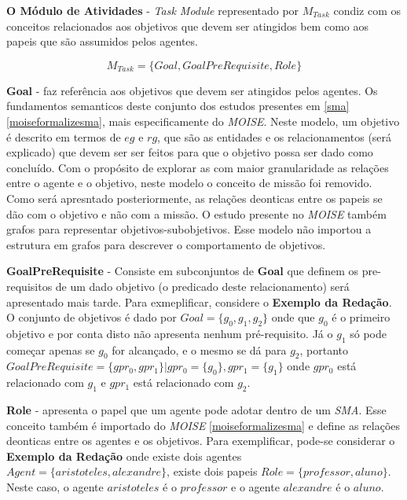 \textbf{O Módulo de Atividades} - \textit{Task Module} representado por $M_{Task}$ condiz com os conceitos relacionados aos objetivos que devem ser 
atingidos bem como aos papeis que são assumidos pelos agentes. 

\begin{equation}
    M_{Task} = \{ Goal, GoalPreRequisite, Role \}
\end{equation}

\textbf{Goal} - faz referência aos objetivos que devem ser atingidos pelos agentes. Os fundamentos semanticos deste conjunto dos estudos presentes em 
\ref{sma} \ref{moiseformalizesma}, mais especificamente do \textit{MOISE}. Neste modelo, um objetivo é descrito em termos de $eg$ e $rg$, que são as entidades e os relacionamentos 
(será explicado) que devem ser ser feitos para que o objetivo possa ser dado como concluído. Com o propósito de explorar as com maior granularidade 
as relações entre o agente e o objetivo, neste modelo o conceito de missão foi removido. Como será apresntado posteriormente, as relações deonticas 
entre os papeis se dão com o objetivo e não com a missão. O estudo presente no \textit{MOISE} também grafos para representar objetivos-subobjetivos. Esse 
modelo não importou a estrutura em grafos para descrever o comportamento de objetivos. 

\textbf{GoalPreRequisite} - Consiste em subconjuntos de \textbf{Goal} que definem os pre-requisitos de um dado objetivo (o predicado deste relacionamento)
será apresentado mais tarde. Para exmeplificar, considere o \textbf{Exemplo da Redação}. O conjunto de objetivos é dado por $Goal = \{ g_0, g_1, g_2 \}$
onde que $g_0$ é o primeiro objetivo e por conta disto não apresenta nenhum pré-requisito. Já o $g_1$ só pode começar apenas se 
$g_0$ for alcançado, e o mesmo se dá para $g_2$, portanto $GoalPreRequisite = \{ gpr_0, gpr_1 \} | gpr_0 = \{ g_0 \}, gpr_1 = \{ g_1 \}$  onde $gpr_0$ está relacionado com $g_1$ e $gpr_1$ está relacionado com $g_2$.

\textbf{Role} - apresenta o papel que um agente pode adotar dentro de um \textit{SMA}. Esse conceito também é importado do \textit{MOISE} 
\ref{moiseformalizesma} e define as relações deonticas entre os agentes e os objetivos. Para exemplificar, pode-se considerar o \textbf{Exemplo da Redação} onde existe dois agentes $Agent = \{ aristoteles, alexandre \}$, existe dois papeis $Role = \{ professor, aluno\}$. Neste caso, o agente $aristoteles$ é  
o $professor$ e o agente $alexandre$ é o $aluno$.

